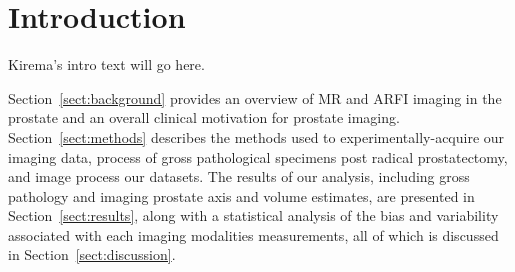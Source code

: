 \section{Introduction}\label{sect:intro}

Kirema's intro text will go here.

Section~\ref{sect:background} provides an overview of MR and ARFI imaging in
the prostate and an overall clinical motivation for prostate imaging.
Section~\ref{sect:methods} describes the methods used to experimentally-acquire
our imaging data, process of gross pathological specimens post radical
prostatectomy, and image process our datasets.  The results of our analysis,
including gross pathology and imaging prostate axis and volume estimates, are
presented in Section~\ref{sect:results}, along with a statistical analysis of
the bias and variability associated with each imaging modalities measurements,
all of which is discussed in Section~\ref{sect:discussion}.
